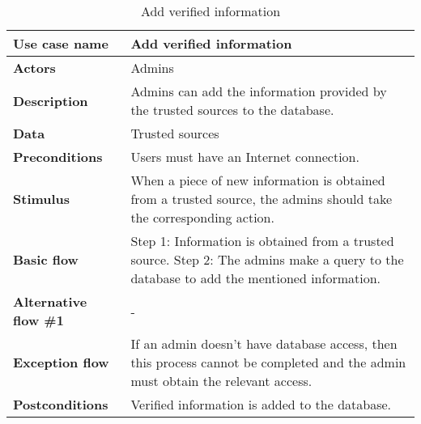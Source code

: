 \documentclass[listof=nochaptergap]{report}
\begin{document}
    \begin{table}[H]
        \centering
         \begin{tabular}{| p{4cm} | p{10cm} |} 
         \hline
         \textbf{Use case name} & Add verified information \\
         \hline
         \textbf{Actors} & Admins \\
         \hline
         \textbf{Description} & Admins can add the information provided by the trusted sources to the database. \\
         \hline
         \textbf{Data} & Trusted sources \\
         \hline
         \textbf{Preconditions} & Users must have an Internet connection. \\
         \hline
         \textbf{Stimulus} & When a piece of new information is obtained from a trusted source, the admins should take the corresponding action. \\
         \hline
         \textbf{Basic flow} & Step 1: Information is obtained from a trusted source. \newline Step 2: The admins make a query to the database to add the mentioned information. \\
         \hline
         \textbf{Alternative flow \#1} & - \\
         \hline
         \textbf{Exception flow} & If an admin doesn't have database access, then this process cannot be completed and the admin must obtain the relevant access. \\
         \hline
         \textbf{Postconditions} & Verified information is added to the database. \\
         \hline
         \end{tabular}
        \caption{Add verified information}
        \label{tab:table9}
    \end{table}
\end{document}
